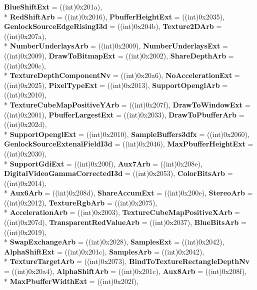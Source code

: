 \begin{DoxyCompactItemize}
{\bfseries Blue\-Shift\-Ext} = ((int)0x201a), 
\\*
{\bfseries Red\-Shift\-Arb} = ((int)0x2016), 
{\bfseries Pbuffer\-Height\-Ext} = ((int)0x2035), 
{\bfseries Genlock\-Source\-Edge\-Rising\-I3d} = ((int)0x204b), 
{\bfseries Texture2\-D\-Arb} = ((int)0x207a), 
\\*
{\bfseries Number\-Underlays\-Arb} = ((int)0x2009), 
{\bfseries Number\-Underlays\-Ext} = ((int)0x2009), 
{\bfseries Draw\-To\-Bitmap\-Ext} = ((int)0x2002), 
{\bfseries Share\-Depth\-Arb} = ((int)0x200c), 
\\*
{\bfseries Texture\-Depth\-Component\-Nv} = ((int)0x20a6), 
{\bfseries No\-Acceleration\-Ext} = ((int)0x2025), 
{\bfseries Pixel\-Type\-Ext} = ((int)0x2013), 
{\bfseries Support\-Opengl\-Arb} = ((int)0x2010), 
\\*
{\bfseries Texture\-Cube\-Map\-Positive\-Y\-Arb} = ((int)0x207f), 
{\bfseries Draw\-To\-Window\-Ext} = ((int)0x2001), 
{\bfseries Pbuffer\-Largest\-Ext} = ((int)0x2033), 
{\bfseries Draw\-To\-Pbuffer\-Arb} = ((int)0x202d), 
\\*
{\bfseries Support\-Opengl\-Ext} = ((int)0x2010), 
{\bfseries Sample\-Buffers3dfx} = ((int)0x2060), 
{\bfseries Genlock\-Source\-Extenal\-Field\-I3d} = ((int)0x2046), 
{\bfseries Max\-Pbuffer\-Height\-Ext} = ((int)0x2030), 
\\*
{\bfseries Support\-Gdi\-Ext} = ((int)0x200f), 
{\bfseries Aux7\-Arb} = ((int)0x208e), 
{\bfseries Digital\-Video\-Gamma\-Corrected\-I3d} = ((int)0x2053), 
{\bfseries Color\-Bits\-Arb} = ((int)0x2014), 
\\*
{\bfseries Aux6\-Arb} = ((int)0x208d), 
{\bfseries Share\-Accum\-Ext} = ((int)0x200e), 
{\bfseries Stereo\-Arb} = ((int)0x2012), 
{\bfseries Texture\-Rgb\-Arb} = ((int)0x2075), 
\\*
{\bfseries Acceleration\-Arb} = ((int)0x2003), 
{\bfseries Texture\-Cube\-Map\-Positive\-X\-Arb} = ((int)0x207d), 
{\bfseries Transparent\-Red\-Value\-Arb} = ((int)0x2037), 
{\bfseries Blue\-Bits\-Arb} = ((int)0x2019), 
\\*
{\bfseries Swap\-Exchange\-Arb} = ((int)0x2028), 
{\bfseries Samples\-Ext} = ((int)0x2042), 
{\bfseries Alpha\-Shift\-Ext} = ((int)0x201c), 
{\bfseries Samples\-Arb} = ((int)0x2042), 
\\*
{\bfseries Texture\-Target\-Arb} = ((int)0x2073), 
{\bfseries Bind\-To\-Texture\-Rectangle\-Depth\-Nv} = ((int)0x20a4), 
{\bfseries Alpha\-Shift\-Arb} = ((int)0x201c), 
{\bfseries Aux8\-Arb} = ((int)0x208f), 
\\*
{\bfseries Max\-Pbuffer\-Width\-Ext} = ((int)0x202f), 

\end{DoxyCompactItemize}

